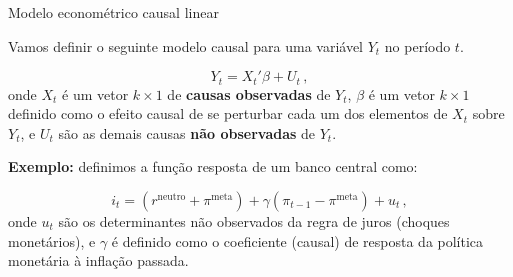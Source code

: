 \documentclass[11pt]{beamer}
\newenvironment{halfwideitemize}{\itemize\addtolength{\itemsep}{0.5em}}{\enditemize}
\begin{document}
	\begin{frame}{Modelo econométrico causal linear}
	\begin{halfwideitemize}
		\item Vamos definir o seguinte modelo causal para uma variável $Y_t$ no período $t$.
		
		$$Y_t = X_t'\beta + U_t \, ,$$
		onde $X_t$ é um vetor $k \times 1$ de \textbf{causas observadas} de $Y_t$, $\beta$ é um vetor $k\times 1$ {\color{orange}definido} como o efeito causal de se perturbar cada um dos elementos de $X_t$ sobre $Y_t$, e $U_t$ são as demais causas \textbf{não observadas} de $Y_t$.
		
		\item \textbf{Exemplo:} definimos a função resposta de um banco central como:
		
		$$i_t = (r^{\text{neutro}} + \pi^{\text{meta}}) + \gamma(\pi_{t-1}-\pi^{\text{meta}}) + u_t \, ,$$
		onde $u_t$ são os determinantes não observados da regra de juros (choques monetários), e $\gamma$ é definido como o coeficiente (causal) de resposta da política monetária à inflação passada.
	
	\end{halfwideitemize}
	\end{frame}
	
\end{document}
